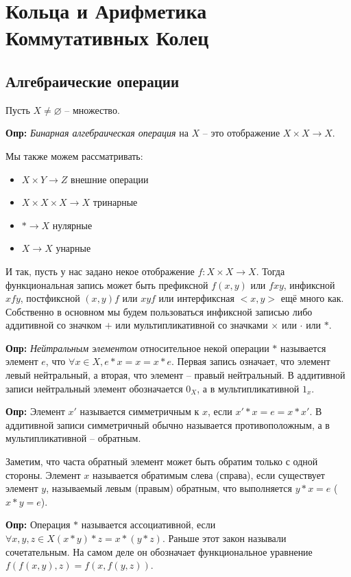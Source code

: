 \chapter{Кольца и Арифметика Коммутативных Колец}
\section{Алгебраические операции}
Пусть $X\neq\varnothing$ – множество.

\textbf{Опр:} \emph{Бинарная алгебраическая операция} на $X$ – это отображение
$X\times X\longrightarrow X$.

Мы также можем рассматривать:
\begin{itemize}
    \item $X\times Y\longrightarrow Z$ внешние операции
    \item $X\times X\times X\longrightarrow X$ тринарные
    \item ${*}\longrightarrow X$ нулярные
    \item $X\longrightarrow X$ унарные
\end{itemize}

И так, пусть у нас задано некое отображение $f: X\times X\longrightarrow X$.
Тогда функциональная запись может быть префиксной $f(x,y)$ или $fxy$, инфиксной
$xfy$, постфиксной $(x,y)f$ или $xyf$ или интерфиксная $<x,y>$ ещё много как.
Собственно в основном мы будем пользоваться инфиксной записью либо аддитивной
со значком $+$ или мультипликативной со значками $\times$ или $\cdot$ или $*$.

\textbf{Опр:} \emph{Нейтральным элементом} относительное некой операции $*$
называется элемент $e$, что $\forall x\in X, e*x = x = x*e$. Первая запись
означает, что элемент левый нейтральный, а вторая, что элемент – правый
нейтральный. В аддитивной записи нейтральный элемент обозначается $0_X$, а в
мультипликативной $1_x$.

\textbf{Опр:} Элемент $x'$ называется симметричным к $x$, если $x'*x=e=x*x'$.
В аддитивной записи симметричный обычно называется противоположным, а в
мультипликативной – обратным.

Заметим, что часта обратный элемент может быть обратим только с одной стороны.
Элемент $x$ называется обратимым слева (справа), если существует элемент $y$,
называемый левым (правым) обратным, что выполняется $y*x=e$ ($x*y=e$).

\textbf{Опр:} Операция $*$ называется ассоциативной, если $\forall x, y, z \in
X (x*y)*z = x*(y*z)$. Раньше этот закон называли сочетательным. На самом деле
он обозначает функциональное уравнение $f(f(x,y),z) = f(x,f(y,z))$.

